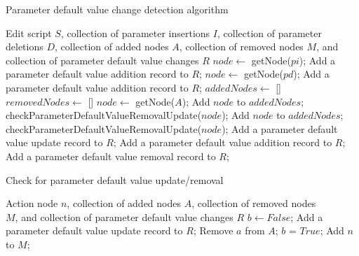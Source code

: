 \begin{algorithm}
	\caption{Parameter default value change detection algorithm}
	\begin{algorithmic}[1]
		\REQUIRE Edit script $S$, collection of parameter insertions $I$, collection of parameter deletions $D$, collection of added nodes $A$, collection of removed nodes $M$, and collection of parameter default value changes $R$
			\STATE $node \gets$ getNode($pi$);
				\STATE Add a parameter default value addition record to $R$;
			\ENDIF
			\STATE $node \gets$ getNode($pd$);
				\STATE Add a parameter default value addition record to $R$;
			\ENDIF
		\ENDFOR
		\STATE $addedNodes \gets$ []
		\STATE $removedNodes \gets$ []
			\STATE $node \gets$ getNode($A$);
				\STATE Add $node$ to $addedNodes$;
				\STATE checkParameterDefaultValueRemovalUpdate($node$);
				\STATE Add $node$ to $addedNodes$;
				\STATE checkParameterDefaultValueRemovalUpdate($node$);
				\STATE Add a parameter default value update record to $R$;
			\ENDIF
		\ENDFOR
			\STATE Add a parameter default value addition record to $R$;
		\ENDFOR
			\STATE Add a parameter default value removal record to $R$;
		\ENDFOR
	\end{algorithmic}
\end{algorithm}

\begin{algorithm}
	\caption{Check for parameter default value update/removal}
	\label{algo:check-param-update-remove}
	\begin{algorithmic}[1]
		\REQUIRE Action node $n$, collection of added nodes $A$, collection of removed nodes \\
		$M$, and collection of parameter default value changes $R$
		\STATE $b \gets False$;
				\STATE Add a parameter default value update record to $R$;
				\STATE Remove $a$ from $A$;
				\STATE $b$ = $True$;
			\ENDIF
		\ENDFOR
			\STATE Add $n$ to $M$;
		\ENDIF
	\end{algorithmic}
\end{algorithm}

